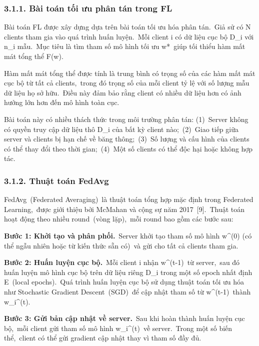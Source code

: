 \subsubsection{3.1.1. Bài toán tối ưu phân tán trong FL}\label{buxe0i-touxe1n-tux1ed1i-ux1b0u-phuxe2n-tuxe1n-trong-fl}

Bài toán FL được xây dựng dựa trên bài toán tối ưu hóa phân tán.~Giả sử có N clients tham gia vào quá trình huấn luyện.~Mỗi client i có dữ liệu cục bộ D\_i với n\_i mẫu.~Mục tiêu là tìm tham số mô hình tối ưu w*~giúp tối thiểu hàm mất mát tổng thể F(w).

Hàm mất mát tổng thể được tính là trung bình có trọng số của các hàm mất mát cục bộ từ tất cả clients,~trong đó trọng số của mỗi client tỷ lệ với số lượng mẫu dữ liệu họ sở hữu.~Điều này đảm bảo rằng client có nhiều dữ liệu hơn có ảnh hưởng lớn hơn đến mô hình toàn cục.

Bài toán này có nhiều thách thức trong môi trường phân tán: (1)~Server không có quyền truy cập dữ liệu thô D\_i của bất kỳ client nào;~(2)~Giao tiếp giữa server và clients bị hạn chế về băng thông;~(3)~Số lượng và cấu hình của clients có thể thay đổi theo thời gian;~(4)~Một số clients có thể độc hại hoặc không hợp tác.

\subsubsection{3.1.2. Thuật toán FedAvg}\label{thuux1eadt-touxe1n-fedavg}

FedAvg~(Federated Averaging)~là thuật toán tổng hợp mặc định trong Federated Learning,~được giới thiệu bởi McMahan và cộng sự năm 2017~{[}9{]}.~Thuật toán hoạt động theo nhiều round~(vòng lặp),~mỗi round bao gồm các bước sau:

\textbf{Bước 1: Khởi tạo và phân phối.}~Server khởi tạo tham số mô hình w\^{}(0) (có thể ngẫu nhiên hoặc từ kiến thức sẵn có)~và gửi cho tất cả clients tham gia.

\textbf{Bước 2: Huấn luyện cục bộ.}~Mỗi client i nhận w\^{}(t-1)~từ server,~sau đó huấn luyện mô hình cục bộ trên dữ liệu riêng D\_i trong một số epoch nhất định E~(local epochs).~Quá trình huấn luyện cục bộ sử dụng thuật toán tối ưu hóa như Stochastic Gradient Descent~(SGD)~để cập nhật tham số từ w\^{}(t-1)~thành w\_i\^{}(t).

\textbf{Bước 3: Gửi bản cập nhật về server.}~Sau khi hoàn thành huấn luyện cục bộ,~mỗi client gửi tham số mô hình w\_i\^{}(t)~về server.~Trong một số biến thể,~client có thể gửi gradient cập nhật thay vì tham số đầy đủ.

